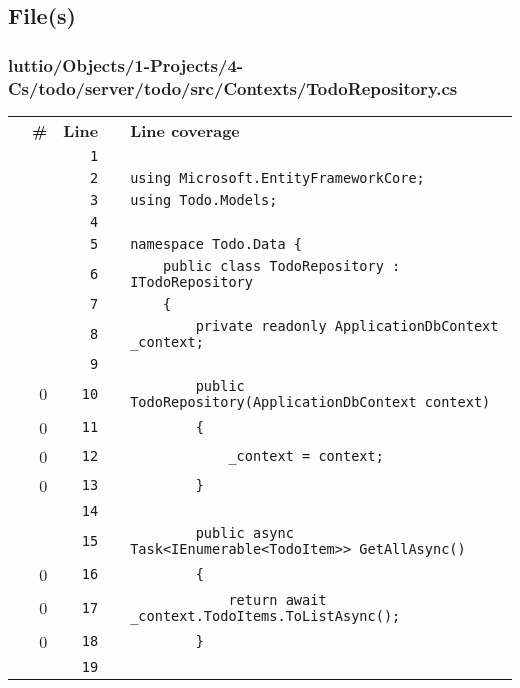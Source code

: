 \documentclass[a4paper,landscape,10pt]{article}
\begin{document}
\subsection{File(s)}
\subsubsection{luttio/Objects/1-Projects/4-Cs/todo/server/todo/src/Contexts/TodoRepository.cs}
\begin{longtable}[l]{lrrll}
\textbf{} & \textbf{\#} & \textbf{Line} & \textbf{} & \textbf{Line coverage}\\
\cellcolor{gray} &  & \verb~1~ & & \verb~~\\
\cellcolor{gray} &  & \verb~2~ & & \verb~using Microsoft.EntityFrameworkCore;~\\
\cellcolor{gray} &  & \verb~3~ & & \verb~using Todo.Models;~\\
\cellcolor{gray} &  & \verb~4~ & & \verb~~\\
\cellcolor{gray} &  & \verb~5~ & & \verb~namespace Todo.Data {~\\
\cellcolor{gray} &  & \verb~6~ & & \verb~    public class TodoRepository : ITodoRepository~\\
\cellcolor{gray} &  & \verb~7~ & & \verb~    {~\\
\cellcolor{gray} &  & \verb~8~ & & \verb~        private readonly ApplicationDbContext _context;~\\
\cellcolor{gray} &  & \verb~9~ & & \verb~~\\
\cellcolor{red} & 0 & \verb~10~ & & \verb~        public TodoRepository(ApplicationDbContext context)~\\
\cellcolor{red} & 0 & \verb~11~ & & \verb~        {~\\
\cellcolor{red} & 0 & \verb~12~ & & \verb~            _context = context;~\\
\cellcolor{red} & 0 & \verb~13~ & & \verb~        }~\\
\cellcolor{gray} &  & \verb~14~ & & \verb~~\\
\cellcolor{gray} &  & \verb~15~ & & \verb~        public async Task<IEnumerable<TodoItem>> GetAllAsync()~\\
\cellcolor{red} & 0 & \verb~16~ & & \verb~        {~\\
\cellcolor{red} & 0 & \verb~17~ & & \verb~            return await _context.TodoItems.ToListAsync();~\\
\cellcolor{red} & 0 & \verb~18~ & & \verb~        }~\\
\cellcolor{gray} &  & \verb~19~ & & \verb~~\\

\end{longtable}
\end{document}
